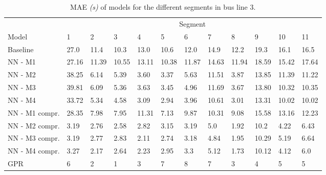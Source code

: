 \begin{table}[H]
  \centering
  \caption{MAE \textit{(s)} of models for the different segments in bus line 3.}
  \label{tbl:model-mae-of-segs-203}
  \begin{adjustbox}{center}
  \begin{tabular}{ l | l | l | l | l | l | l | l | l | l | l | l }
    & \multicolumn{11}{c}{Segment} \\
    Model       & 1 & 2 & 3 & 4 & 5 & 6 & 7 & 8 & 9 & 10 & 11 \\
    \hline
    Baseline  & 27.0 & 11.4 & 10.3 & 13.0 & 10.6 & 12.0 & 14.9 & 12.2 & 19.3 & 16.1  & 16.5 \\
    NN - M1         & 27.16& 11.39& 10.55& 13.11& 10.38& 11.87& 14.63& 11.94& 18.59& 15.42& 17.64\\
    NN - M2         & 38.25 & 6.14 & 5.39 & 3.60 &  3.37 & 5.63 &  11.51 & 3.87 & 13.85 & 11.39  & 11.22\\
    NN - M3         & 39.81 & 6.09 & 5.36 & 3.63 &  3.45 & 4.96 &  11.69 & 3.67 & 13.80 & 10.32  & 10.35\\
    NN - M4         & 33.72 & 5.34 & 4.58 & 3.09 & 2.94 & 3.96 &  10.61 & 3.01 & 13.31 & 10.02  & 10.02\\
    NN - M1 compr.         & 28.35& 7.98& 7.95& 11.31& 7.13& 9.87& 10.31& 9.08& 15.58& 13.16& 12.23 \\ 
    NN - M2 compr.         & 3.19& 2.76& 2.58& 2.82& 3.15& 3.19& 5.0& 1.92& 10.2& 4.22& 6.43 \\
    NN - M3 compr.         & 3.19& 2.77& 2.83& 2.11& 2.74& 3.18& 4.84& 1.95& 10.29& 5.19& 6.64 \\
    NN - M4 compr.         & 3.27& 2.17& 2.64& 2.23& 2.95& 3.3& 5.12& 1.73& 10.12& 4.12& 6.0 \\
    GPR            & 6 & 2 & 1 & 3 &  7 & 8 &  7 & 3 & 4 & 5  & 5 \\
  \end{tabular}
  \end{adjustbox}
\end{table}

